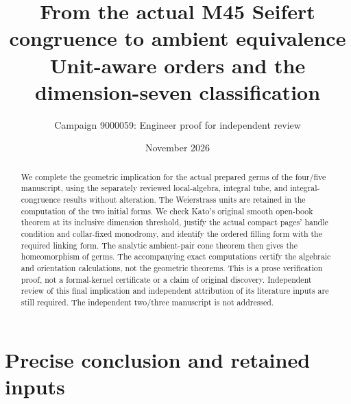\documentclass[11pt]{article}
\title{From the actual M45 Seifert congruence to ambient equivalence\\
Unit-aware orders and the dimension-seven classification}
\author{Campaign 9000059: Engineer proof for independent review}
\date{November 2026}
\begin{document}
\maketitle

\begin{abstract}
We complete the geometric implication for the actual prepared germs of
the four/five manuscript, using the separately reviewed local-algebra,
integral tube, and integral-congruence results without alteration.
The Weierstrass units are retained in the computation of the two
initial forms. We check Kato's original smooth open-book theorem at
its inclusive dimension threshold, justify the actual compact pages'
handle condition and collar-fixed monodromy, and identify the ordered
filling form with the required linking form. The analytic ambient-pair
cone theorem then gives the homeomorphism of germs.
The accompanying exact computations certify the algebraic and
orientation calculations, not the geometric theorems. This is a prose
verification proof, not a formal-kernel certificate or a claim of
original discovery. Independent review of this final implication and
independent attribution of its literature inputs are still required.
The independent two/three manuscript is not addressed.
\end{abstract}

\section{Precise conclusion and retained inputs}
\end{document}
